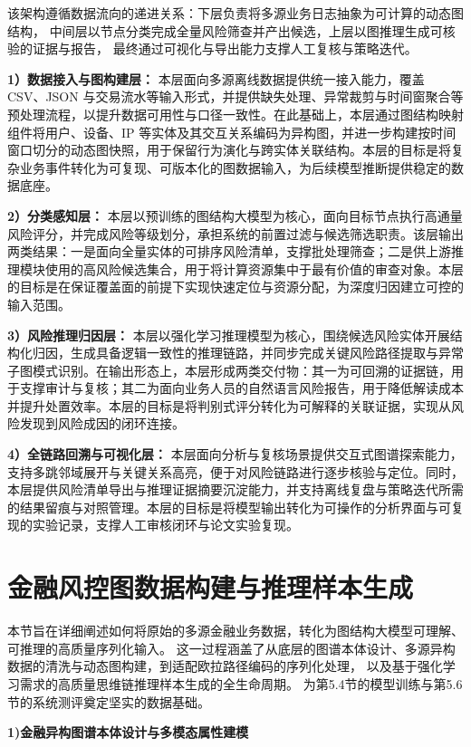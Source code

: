 该架构遵循数据流向的递进关系：下层负责将多源业务日志抽象为可计算的动态图结构，
中间层以节点分类完成全量风险筛查并产出候选，上层以图推理生成可核验的证据与报告，
最终通过可视化与导出能力支撑人工复核与策略迭代。

\textbf{1）数据接入与图构建层：}
本层面向多源离线数据提供统一接入能力，覆盖 CSV、JSON 与交易流水等输入形式，并提供缺失处理、异常裁剪与时间窗聚合等预处理流程，以提升数据可用性与口径一致性。在此基础上，本层通过图结构映射组件将用户、设备、IP 等实体及其交互关系编码为异构图，并进一步构建按时间窗口切分的动态图快照，用于保留行为演化与跨实体关联结构。本层的目标是将复杂业务事件转化为可复现、可版本化的图数据输入，为后续模型推断提供稳定的数据底座。

\textbf{2）分类感知层：}
本层以预训练的图结构大模型为核心，面向目标节点执行高通量风险评分，并完成风险等级划分，承担系统的前置过滤与候选筛选职责。该层输出两类结果：一是面向全量实体的可排序风险清单，支撑批处理筛查；二是供上游推理模块使用的高风险候选集合，用于将计算资源集中于最有价值的审查对象。本层的目标是在保证覆盖面的前提下实现快速定位与资源分配，为深度归因建立可控的输入范围。

\textbf{3）风险推理归因层：}
本层以强化学习推理模型为核心，围绕候选风险实体开展结构化归因，生成具备逻辑一致性的推理链路，并同步完成关键风险路径提取与异常子图模式识别。在输出形态上，本层形成两类交付物：其一为可回溯的证据链，用于支撑审计与复核；其二为面向业务人员的自然语言风险报告，用于降低解读成本并提升处置效率。本层的目标是将判别式评分转化为可解释的关联证据，实现从风险发现到风险成因的闭环连接。

\textbf{4）全链路回溯与可视化层：}
本层面向分析与复核场景提供交互式图谱探索能力，支持多跳邻域展开与关键关系高亮，便于对风险链路进行逐步核验与定位。同时，本层提供风险清单导出与推理证据摘要沉淀能力，并支持离线复盘与策略迭代所需的结果留痕与对照管理。本层的目标是将模型输出转化为可操作的分析界面与可复现的实验记录，支撑人工审核闭环与论文实验复现。



\section{金融风控图数据构建与推理样本生成}
本节旨在详细阐述如何将原始的多源金融业务数据，转化为图结构大模型可理解、可推理的高质量序列化输入。
这一过程涵盖了从底层的图谱本体设计、多源异构数据的清洗与动态图构建，到适配欧拉路径编码的序列化处理，
以及基于强化学习需求的高质量思维链推理样本生成的全生命周期。
为第5.4节的模型训练与第5.6节的系统测评奠定坚实的数据基础。

\textbf{1)金融异构图谱本体设计与多模态属性建模}

